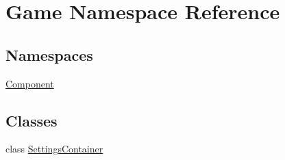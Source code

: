\hypertarget{namespace_game}{}\section{Game Namespace Reference}
\label{namespace_game}
\subsection*{Namespaces}
\begin{DoxyCompactItemize}
\item 
 \mbox{\hyperlink{namespace_game_1_1_component}{Component}}
\end{DoxyCompactItemize}
\subsection*{Classes}
\begin{DoxyCompactItemize}
\item 
class \mbox{\hyperlink{class_game_1_1_settings_container}{Settings\+Container}}
\end{DoxyCompactItemize}

